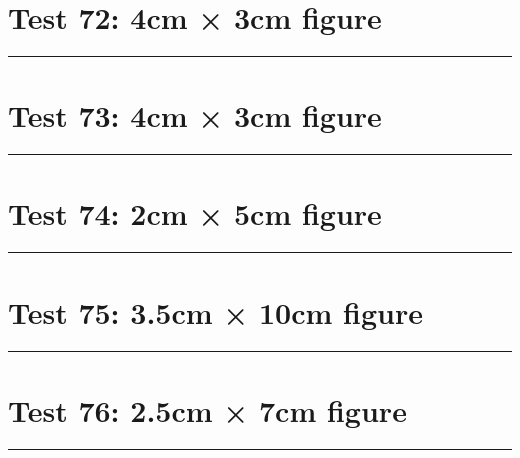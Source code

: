 \documentclass[a4paper,11pt]{article}
\begin{document}
\section*{Test 72: 4cm × 3cm figure}
\begin{swarmwrap}%
  \begin{minipage}[t]{4cm}
    \centering
    \rule{\linewidth}{3cm}
  \end{minipage}%
\end{swarmwrap}%
\swarmwrapnext
\lipsum[19]
\lipsum[20]
\lipsum[21]
\lipsum[22]
\section*{Test 73: 4cm × 3cm figure}
\begin{swarmwrap}%
  \begin{minipage}[t]{4cm}
    \centering
    \rule{\linewidth}{3cm}
  \end{minipage}%
\end{swarmwrap}%
\swarmwrapnext
\lipsum[105]
\lipsum[106]
\lipsum[107]
\lipsum[108]
\section*{Test 74: 2cm × 5cm figure}
\begin{swarmwrap}%
  \begin{minipage}[t]{2cm}
    \centering
    \rule{\linewidth}{5cm}
  \end{minipage}%
\end{swarmwrap}%
\swarmwrapnext
\lipsum[22]
\lipsum[23]
\lipsum[24]
\section*{Test 75: 3.5cm × 10cm figure}
\begin{swarmwrap}%
  \begin{minipage}[t]{3cm}
    \centering
    \rule{\linewidth}{10cm}
  \end{minipage}%
\end{swarmwrap}%
\swarmwrapnext
\lipsum[68]
\lipsum[69]
\lipsum[70]
\lipsum[71]
\lipsum[72]
\section*{Test 76: 2.5cm × 7cm figure}
\begin{swarmwrap}%
  \begin{minipage}[t]{2cm}
    \centering
    \rule{\linewidth}{7cm}
  \end{minipage}%
\end{swarmwrap}%
\swarmwrapnext
\lipsum[69]
\lipsum[70]
\lipsum[71]
\lipsum[72]
\end{document}
